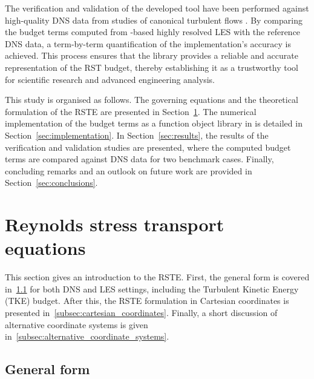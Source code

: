 The verification and validation of the developed tool have been performed against high-quality DNS data from studies of canonical turbulent flows \cite{lee2015direct}. By comparing the budget terms computed from \OF-based highly resolved LES with the reference DNS data, a term-by-term quantification of the implementation's accuracy is achieved. This process ensures that the library provides a reliable and accurate representation of the RST budget, thereby establishing it as a trustworthy tool for scientific research and advanced engineering analysis.

This study is organised as follows. The governing equations and the theoretical formulation of the RSTE are presented in Section~\ref{sec:RSTE}. The numerical implementation of the budget terms as a function object library in \OF is detailed in Section~\ref{sec:implementation}. In Section~\ref{sec:results}, the results of the verification and validation studies are presented, where the computed budget terms are compared against DNS data for two benchmark cases. Finally, concluding remarks and an outlook on future work are provided in Section~\ref{sec:conclusions}.


\section{Reynolds stress transport equations}
\label{sec:RSTE}

This section gives an introduction to the RSTE.
First, the general form is covered in~\ref{subsec:RSTE_general_form} for both DNS and LES settings, including the Turbulent Kinetic Energy (TKE) budget.
After this, the RSTE formulation in Cartesian coordinates is presented in~\ref{subsec:cartesian_coordinates}.
Finally, a short discussion of alternative coordinate systems is given in~\ref{subsec:alternative_coordinate_systems}.

\subsection{General form}
\label{subsec:RSTE_general_form}

